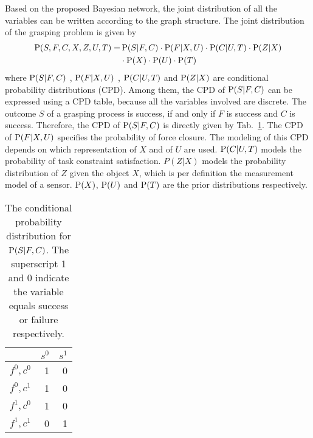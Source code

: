 Based on the proposed Bayesian network, the joint distribution of all the variables can be written according to the graph structure. The joint distribution of the grasping problem is given by 
\begin{equation}
\begin{split}
\operatorname*{\text{P}} (S,F,C,X,Z,U,T) = & \operatorname*{\text{P}} (S | F, C )\cdot \operatorname*{\text{P}}(F| X,U) \cdot \operatorname*{\text{P}}(C | U,T) \cdot \operatorname*{\text{P}}(Z|X) \\ 
  &\cdot \operatorname*{\text{P}}(X) \cdot \operatorname*{\text{P}} (U) \cdot \operatorname*{\text{P}}(T)
\end{split}
\label{equ:joint_distribution_grasp}
\end{equation} 
where $\operatorname*{\text{P}} (S | F, C )$ , $\operatorname*{\text{P}}(F| X,U)$ , $\operatorname*{\text{P}}(C | U,T)$ and $\operatorname*{\text{P}}(Z|X)$ are conditional probability distributions (CPD). Among them, the CPD of  $\operatorname*{\text{P}} (S | F, C )$  can be expressed  using a CPD table, because all the variables involved are discrete. The outcome $S$ of a grasping process is success, if and only if $F$ is success and $C$ is success. Therefore, the CPD of $\operatorname*{\text{P}} (S | F, C )$ is directly given by Tab.~\ref{tab:cpd}. The CPD of $\operatorname*{\text{P}}(F|X,U)$ specifies the probability of force closure. The modeling of this CPD depends on which representation of $X$ and of $U$ are used. $\operatorname*{\text{P}}(C | U,T)$ models the probability of task constraint satisfaction.  $P(Z|X) $ models the probability distribution of $Z$ given the object $X$, which is per definition the measurement model of a sensor. $\operatorname*{\text{P}}(X)$, $\operatorname*{\text{P}}(U)$ and $\operatorname*{\text{P}}(T)$ are the prior distributions respectively. 

\begin{table}[!htbp]
\centering
\begin{tabular}{|l|r|r|}
\hline
& $s^0$ & $s^1$ \\ \hline
$f^0, c^0$ & 1     & 0     \\ \hline
$f^0, c^1$ & 1     & 0     \\ \hline
$f^1, c^0$ & 1     & 0     \\ \hline
$f^1, c^1$ & 0     & 1     \\ \hline
\end{tabular}
\caption{The conditional probability distribution for $\operatorname*{\text{P}} (S | F, C )$. The superscript 1 and 0 indicate the variable equals success or failure respectively.}
\label{tab:cpd}
\end{table}

